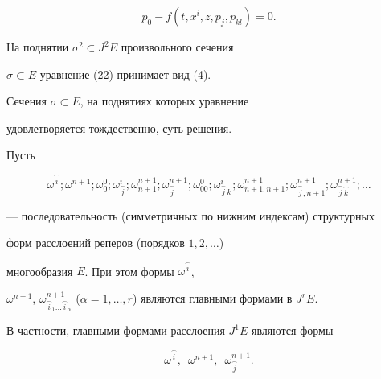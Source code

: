 \begin{equation}


p_0-f ({t,x^i,z,p_j,p_{kl}})=0.


\end{equation}


На поднятии $\sigma^2 \subset J^2 E$ произвольного сечения


$\sigma \subset E$ уравнение (22) принимает вид (4).


Сечения $\sigma \subset E$, на поднятиях которых уравнение 


удовлетворяется тождественно, суть решения.





Пусть


\begin{equation}


\omega^{\overset{\frown}{i}{}}


;\omega^{n+1} ;\omega_0^0 ;\omega_{\overset{\frown}{j}{}}^i ;


\omega_{n+1}^{n+1} ;\omega_{\overset{\frown}{j}{}}^{n+1};


\omega_{00}^0 ;\omega_{\overset{\frown}{j}{}


\overset{\frown}{k}{}}^i;


\omega_{n+1,n+1}^{n+1} ;\omega_{\overset{\frown}{j}{}


,n+1}^{n+1} ;\omega_{\overset{\frown}{j}{}


\overset{\frown}{k}{}}^{n+1}; \dotsc


\end{equation}


--- последовательность (симметричных по нижним индексам) структурных 


форм расслоений реперов (порядков $1,2, \dotsc $)


многообразия $E$. При этом формы $\omega^{\overset{\frown}{i}{}}$,


$\omega^{n+1}$, $\omega_{\overset{\frown}{i}{}


_1 \dotsc \overset{\frown}{i}{}


_\alpha}^{n+1}$ (${\alpha=1, \dotsc,r}$) являются главными формами в $J^rE$.


В частности, главными формами расслоения $J^1E$ являются формы


\begin{equation}


\omega^{\overset{\frown}{i}{}},


\ \; \omega^{n+1},\ \; \omega_{\overset{\frown}{j}{}}^{n+1}.


\end{equation}


